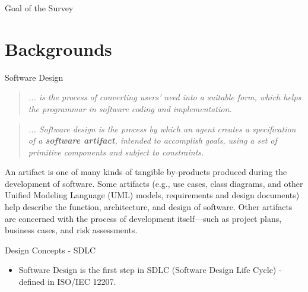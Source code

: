 \documentclass[slidetop,mathserif,red]{beamer}
\begin{document}
\begin{frame}{Goal of the Survey}
\end{frame}



\section{Backgrounds}
\begin{frame}{Software Design }
 \begin{quotation}
 	\textit{... is the process of converting users' need into a suitable form, which helps the programmar in software coding and implementation.}
 \end{quotation}

\begin{quotation}
	\textit{... Software design is the process by which an agent creates a specification of a \textbf{software artifact}, intended to accomplish goals, using a set of primitive components and subject to constraints.}
\end{quotation}

\tiny An artifact is one of many kinds of tangible by-products produced during the development of software. Some artifacts (e.g., use cases, class diagrams, and other Unified Modeling Language (UML) models, requirements and design documents) help describe the function, architecture, and design of software. Other artifacts are concerned with the process of development itself—such as project plans, business cases, and risk assessments.
\end{frame}

\begin{frame}{Design Concepts - SDLC}
\begin{itemize}
	\item Software Design is the first step in SDLC (Software Design Life Cycle) - defined in ISO/IEC 12207.
\end{itemize}
\begin{center}
\end{center}
\end{frame}
\end{document}
